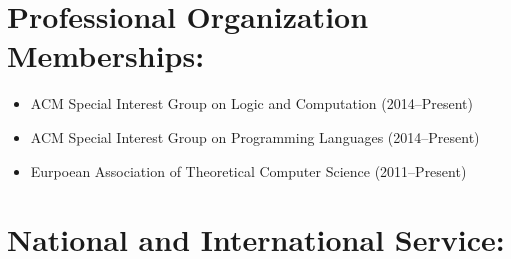 \documentclass[11pt]{article}
\begin{document}
\section{Professional Organization Memberships:}
\label{sec:memberships}
\begin{itemize}\itemsep-2px
\item ACM Special Interest Group on Logic and Computation (2014--Present) 
\item ACM Special Interest Group on Programming Languages (2014--Present)  
\item Eurpoean Association of Theoretical Computer Science (2011--Present)
\end{itemize}

\section{National and International Service:}
\label{sec:national_and_international_service:}
\end{document}
